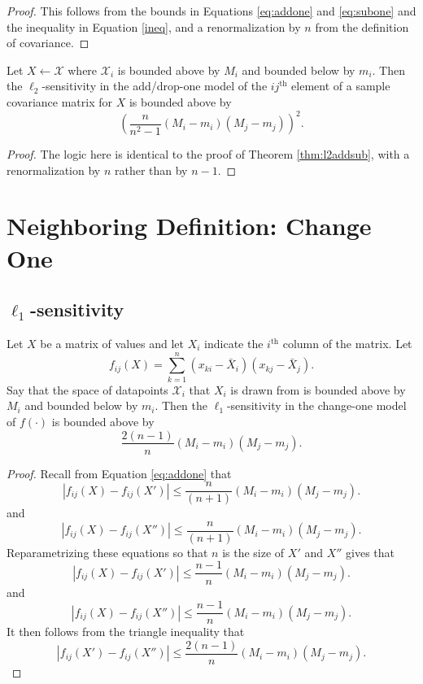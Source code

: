 \documentclass[11pt]{scrartcl} %
\begin{document}
\begin{proof}
This follows from the bounds in Equations \ref{eq:addone} and \ref{eq:subone} and the inequality in Equation \ref{ineq}, and a renormalization by $n$ from the definition of covariance.
\end{proof}

\begin{corollary}
\label{thm:l2addsub}
Let $X \leftarrow \mathcal{X}$ where $\mathcal{X}_i$ is bounded above by $M_i$ and bounded below by $m_i$. Then the $\ell_2$-sensitivity in the add/drop-one model of the $ij^{\text{th}}$ element of a sample covariance matrix for $X$ is bounded above by
$$\left(\frac{n}{n^2-1}(M_i - m_i)(M_j - m_j)\right)^2.$$
\end{corollary}

\begin{proof}
The logic here is identical to the proof of Theorem \ref{thm:l2addsub}, with a renormalization by $n$ rather than by $n-1$.
\end{proof}

\section{Neighboring Definition: Change One}
\subsection{$\ell_1$-sensitivity}

\begin{theorem}
\label{thm:l1change1}
Let $X$ be a matrix of values and let $X_i$ indicate the $i^{\text{th}}$ column of the matrix. Let
$$ f_{ij} (X)= \sum_{k=1}^n (x_{ki} - \bar{X}_i)(x_{kj} - \bar{X}_j).$$
Say that the space of datapoints $\mathcal{X}_i$ that $X_i$ is drawn from is bounded above by $M_i$ and bounded below by $m_i$. Then the $\ell_1$-sensitivity in the change-one model of $f(\cdot)$ is bounded above by
$$ \frac{2(n-1)}{n}  (M_i - m_i)(M_j - m_j).$$
\end{theorem}

\begin{proof}
Recall from Equation \ref{eq:addone} that 
$$ \left\vert f_{ij}(X) - f_{ij}(X') \right\vert \le \frac{n}{(n+1)}  (M_i - m_i)(M_j - m_j).$$
and
$$ \left\vert f_{ij}(X) - f_{ij}(X'') \right\vert \le \frac{n}{(n+1)}  (M_i - m_i)(M_j - m_j).$$
Reparametrizing these equations so that $n$ is the size of $X'$ and $X''$ gives that 
$$ \left\vert f_{ij}(X) - f_{ij}(X') \right\vert \le \frac{n-1}{n}  (M_i - m_i)(M_j - m_j).$$
and
$$ \left\vert f_{ij}(X) - f_{ij}(X'') \right\vert \le \frac{n-1}{n}  (M_i - m_i)(M_j - m_j).$$
It then follows from the triangle inequality that 
$$ \left\vert f_{ij}(X') - f_{ij}(X'') \right\vert \le \frac{2(n-1)}{n}  (M_i - m_i)(M_j - m_j).$$
\end{proof}
\end{document}
